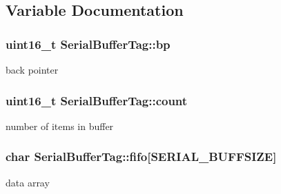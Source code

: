 \subsection{Variable Documentation}
\hypertarget{group__serialbuffer_g80fec57b0c1089e49be601c8e154011f}{
\subsubsection[{bp}]{\setlength{\rightskip}{0pt plus 5cm}uint16\_\-t {\bf SerialBufferTag::bp}}}
\label{group__serialbuffer_g80fec57b0c1089e49be601c8e154011f}


back pointer \hypertarget{group__serialbuffer_gf764ad82a3af5651722c23326f28adbd}{
\subsubsection[{count}]{\setlength{\rightskip}{0pt plus 5cm}uint16\_\-t {\bf SerialBufferTag::count}}}
\label{group__serialbuffer_gf764ad82a3af5651722c23326f28adbd}


number of items in buffer \hypertarget{group__serialbuffer_g0cbebf4bc14ed97a7d673795fccb8f26}{
\subsubsection[{fifo}]{\setlength{\rightskip}{0pt plus 5cm}char {\bf SerialBufferTag::fifo}\mbox{[}SERIAL\_\-BUFFSIZE\mbox{]}}}
\label{group__serialbuffer_g0cbebf4bc14ed97a7d673795fccb8f26}


data array 